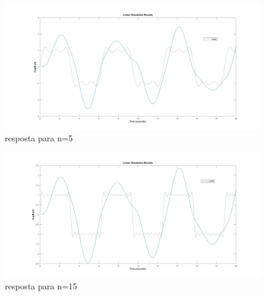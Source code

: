\documentclass[a4paper,12pt,twoside]{article}
\begin{document}
\begin{figure}[H]
\flushleft
\includegraphics[scale=0.25]{alfa=12n=5.jpg}
\caption{resposta para n=5}
\label{fig:n=15 e curva original}
\end{figure}

\begin{figure}[H]
\flushleft
\includegraphics[scale=0.25]{alfa=12n=15.jpg}
\caption{resposta para n=15}
\label{fig:n=15 e curva original}
\end{figure}
\end{document}
